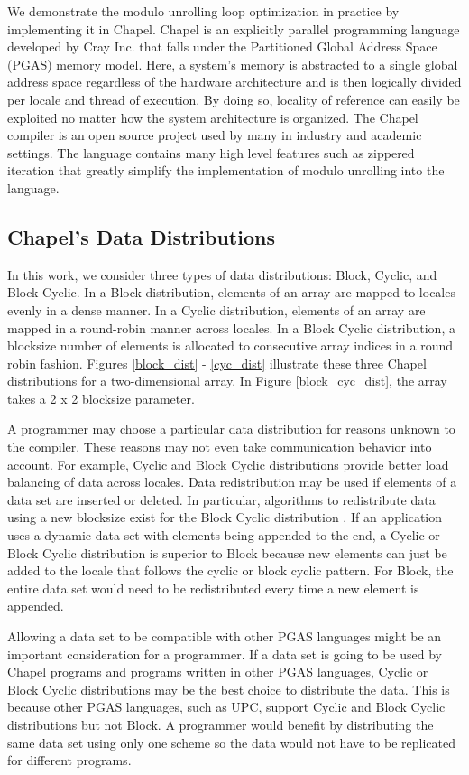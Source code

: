 We demonstrate the modulo unrolling loop optimization in practice by implementing it in Chapel. Chapel is an explicitly parallel programming language developed by Cray Inc. that falls under the Partitioned Global Address Space (PGAS) memory model. Here, a system's memory is abstracted to a single global address space regardless of the hardware architecture and is then logically divided per locale and thread of execution. By doing so, locality of reference can easily be exploited no matter how the system architecture is organized. The Chapel compiler is an open source project used by many in industry and academic settings. The language contains many high level features such as zippered iteration that greatly simplify the implementation of modulo unrolling into the language.

\subsection{Chapel's Data Distributions} 

In this work, we consider three types of data distributions: Block, Cyclic, and Block Cyclic. In a Block distribution, elements of an array are mapped to locales evenly in a dense manner. In a Cyclic distribution, elements of an array are mapped in a round-robin manner across locales. In a Block Cyclic distribution, a blocksize number of elements is allocated to consecutive array indices in a round robin fashion. Figures \ref{block_dist} - \ref{cyc_dist} illustrate these three Chapel distributions for a two-dimensional array. In Figure \ref{block_cyc_dist}, the array takes a 2 x 2 blocksize parameter. 

A programmer may choose a particular data distribution for reasons unknown to the compiler. These reasons may not even take communication behavior into account. For example, Cyclic and Block Cyclic distributions provide better load balancing of data across locales. Data redistribution may be used if elements of a data set are inserted or deleted. In particular, algorithms to redistribute data using a new blocksize exist for the Block Cyclic distribution \cite{walker1996redistribution}. If an application uses a dynamic data set with elements being appended to the end, a Cyclic or Block Cyclic distribution is superior to Block because new elements can just be added to the locale that follows the cyclic or block cyclic pattern. For Block, the entire data set would need to be redistributed every time a new element is appended. 

Allowing a data set to be compatible with other PGAS languages might be an important consideration for a programmer. If a data set is going to be used by Chapel programs and programs written in other PGAS languages, Cyclic or Block Cyclic distributions may be the best choice to distribute the data. This is because other PGAS languages, such as UPC, support Cyclic and Block Cyclic distributions but not Block. A programmer would benefit by distributing the same data set using only one scheme so the data would not have to be replicated for different programs. 

